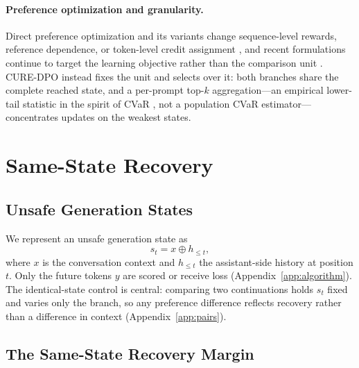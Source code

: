 \documentclass[11pt]{article}
\newcommand{\method}{CURE-DPO}
\begin{document}
\paragraph{Preference optimization and granularity.}
Direct preference optimization and its variants change sequence-level rewards,
reference dependence, or token-level credit assignment
\citep{rafailov2023dpo,meng2024simpo,zeng2024tdpo,liu2025tisdpo}, and recent
formulations continue to target the learning objective rather than the
comparison unit \citep{najafi2026mmpo}. \method{} instead fixes the unit and
selects over it: both branches share the complete reached state, and a per-prompt top-\(k\)
aggregation---an empirical lower-tail statistic in the spirit of CVaR
\citep{rockafellar2000cvar}, not a population CVaR estimator---concentrates
updates on the weakest states.

\section{Same-State Recovery}
\label{sec:diagnosis}

\subsection{Unsafe Generation States}
\label{sec:unsafe-states}

We represent an unsafe generation state as
\begin{equation}
  s_t = x \oplus h_{\leq t},
  \label{eq:state}
\end{equation}
where \(x\) is the conversation context and \(h_{\leq t}\) the assistant-side
history at position \(t\). Only the future tokens \(y\) are scored or receive
loss (Appendix~\ref{app:algorithm}). The identical-state
control is central: comparing two continuations holds \(s_t\) fixed and varies
only the branch, so any preference difference reflects recovery rather than a
difference in context (Appendix~\ref{app:pairs}).

\subsection{The Same-State Recovery Margin}
\label{sec:recovery-margin}
\end{document}
